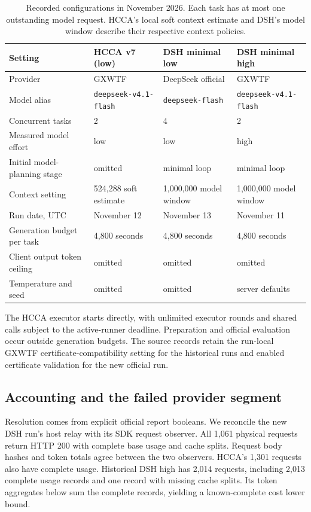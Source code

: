 \documentclass[10pt,a4paper]{article}
\begin{document}
\begin{table}[ht]
\centering
\small
\setlength{\tabcolsep}{3pt}
\begin{tabular}{p{44mm}p{37mm}p{37mm}p{37mm}}
\toprule
Setting & HCCA v7 (low) & DSH minimal low & DSH minimal high\\
\midrule
Provider & GXWTF & DeepSeek official & GXWTF\\
Model alias & \texttt{deepseek-v4.1-flash} & \texttt{deepseek-flash} & \texttt{deepseek-v4.1-flash}\\
Concurrent tasks & 2 & 4 & 2\\
Measured model effort & low & low & high\\
Initial model-planning stage & omitted & minimal loop & minimal loop\\
Context setting & 524,288 soft estimate & 1,000,000 model window & 1,000,000 model window\\
Run date, UTC & November 12 & November 13 & November 11\\
Generation budget per task & 4,800 seconds & 4,800 seconds & 4,800 seconds\\
Client output token ceiling & omitted & omitted & omitted\\
Temperature and seed & omitted & omitted & server defaults\\
\bottomrule
\end{tabular}
\caption{Recorded configurations in November 2026. Each task has at most one
outstanding model request. HCCA's local soft context estimate and DSH's model
window describe their respective context policies.}
\label{tab:config}
\end{table}

The HCCA executor starts directly, with unlimited executor rounds and shared
calls subject to the active-runner deadline. Preparation and official
evaluation occur outside generation budgets. The source records retain the
run-local GXWTF certificate-compatibility setting for the historical runs and
enabled certificate validation for the new official run.

\subsection{Accounting and the failed provider segment}

Resolution comes from explicit official report booleans. We reconcile the
new DSH run's host relay with its SDK request observer. All 1,061 physical
requests return HTTP 200 with complete base usage and cache splits. Request
body hashes and token totals agree between the two observers. HCCA's 1,301
requests also have complete usage. Historical DSH high has 2,014 requests,
including 2,013 complete usage records and one record with missing cache
splits. Its token aggregates below sum the complete records, yielding a
known-complete cost lower bound.
\end{document}

